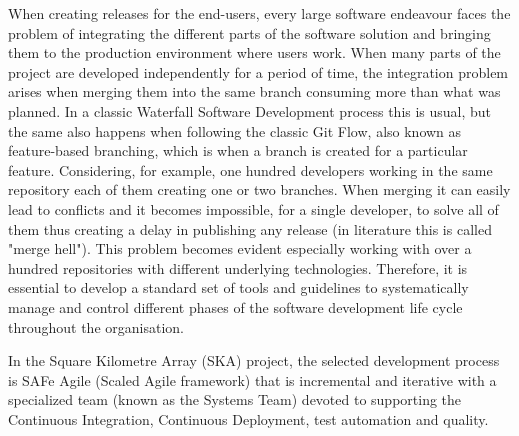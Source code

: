 \documentclass[a4paper,
               keeplastbox,   %
               ]{jacow}
\begin{document}
When creating releases for the end-users, every large software endeavour faces the problem of integrating the different parts of the software solution and bringing them to the production environment where users work. When many parts of the project are developed independently for a period of time, the integration problem arises when merging them into the same branch consuming more than what was planned. In a classic Waterfall Software Development process this is usual, but the same also happens when following the classic Git Flow, also known as feature-based branching, which is when a branch is created for a particular feature. Considering, for example, one hundred developers working in the same repository each of them creating one or two branches. When merging it can easily lead to conflicts and it becomes impossible, for a single developer, to solve all of them thus creating a delay in publishing any release (in literature this is called "merge hell"). This problem becomes evident especially working with over a hundred repositories with different underlying technologies. Therefore, it is essential to develop a standard set of tools and guidelines to systematically manage and control different phases of the software development life cycle throughout the organisation.

In the Square Kilometre Array (SKA) project, the selected development process is SAFe Agile (Scaled Agile framework) that is incremental and iterative with a specialized team (known as the Systems Team) devoted to supporting the Continuous Integration, Continuous Deployment, test automation and quality.
\end{document}
